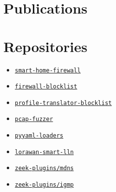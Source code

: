 \documentclass[]{deedy-resume-openfont}
\begin{document}
%
%

\begin{minipage}[t]{0.35\textwidth} 


\vspace{-5pt}
\section{Publications}
\vspace{0.7cm}
\renewcommand\refname{\vskip -1.5cm} %


\nocite{dekeersmaeker2025foresttreerevealinghidden}
\nocite{smart-home-firewall}
\nocite{survey}
\vspace{-11pt}



\section{Repositories}
\renewcommand\refname{\vskip -1.5cm} %
\begin{itemize}
    \item \href{https://github.com/smart-home-network-security/smart-home-firewall}{\texttt{smart-home-firewall}}
    \item \href{https://github.com/smart-home-network-security/firewall-blocklist}{\texttt{firewall-blocklist}}
    \item \href{https://github.com/smart-home-network-security/profile-translator-blocklist}{\texttt{profile-translator-blocklist}}
    \item \href{https://github.com/smart-home-network-security/pcap-fuzzer}{\texttt{pcap-fuzzer}}
    \item \href{https://github.com/smart-home-network-security/pyyaml-loaders}{\texttt{pyyaml-loaders}}
    \item \href{https://github.com/fdekeers/lorawan-smart-lln}{\texttt{lorawan-smart-lln}}
    \item \href{https://github.com/zeek-plugins/mdns}{\texttt{zeek-plugins/mdns}}
    \item \href{https://github.com/zeek-plugins/igmp}{\texttt{zeek-plugins/igmp}}
\end{itemize}
\vspace{-11pt}


\end{minipage}
\end{document}
